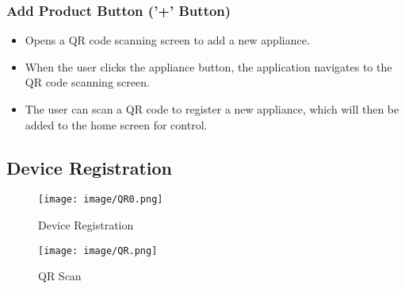 \documentclass[conference]{IEEEtran}
\begin{document}
\subsubsection{Add Product Button ('+' Button)}
\begin{itemize}
    \item Opens a QR code scanning screen to add a new appliance.\\
    \item When the user clicks the appliance button, the application navigates to the QR code scanning screen.\\
    \item The user can scan a QR code to register a new appliance, which will then be added to the home screen for control.\\
\end{itemize}

\clearpage

\subsection{Device Registration}

\begin{figure}[h!]
    \centering
    \texttt{[image: image/QR0.png]}
    \caption{Device Registration}
    \label{fig:enter-label}
\end{figure}
\begin{figure}[h!]
    \centering
    \texttt{[image: image/QR.png]}
    \caption{QR Scan}
    \label{fig:enter-label}
\end{figure}
\end{document}
